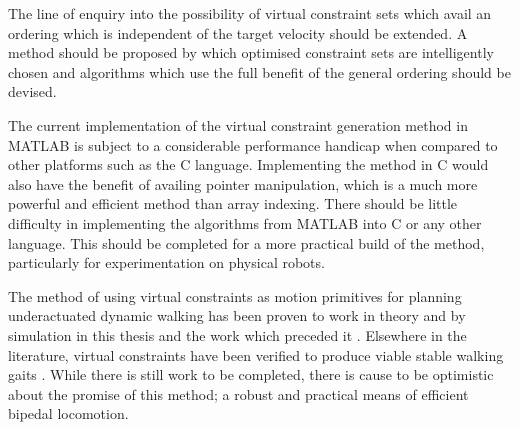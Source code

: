 The line of enquiry into the possibility of virtual constraint sets which avail an ordering which is independent of the target velocity should be extended. A method should be proposed by which optimised constraint sets are intelligently chosen and algorithms which use the full benefit of the general ordering should be devised.

The current implementation of the virtual constraint generation method in MATLAB is subject to a considerable performance handicap when compared to other platforms such as the C language. Implementing the method in C would also have the benefit of availing pointer manipulation, which is a much more powerful and efficient method than array indexing. There should be little difficulty in implementing the algorithms from MATLAB into C or any other language. This should be completed for a more practical build of the method, particularly for experimentation on physical robots.

The method of using virtual constraints as motion primitives for planning underactuated dynamic walking has been proven to work in theory and by simulation in this thesis and the work which preceded it \cite{manchester13planning}. Elsewhere in the literature, virtual constraints have been verified to produce viable stable walking gaits \cite{byl2008approximate, sreenath2011compliant}. While there is still work to be completed, there is cause to be optimistic about the promise of this method; a robust and practical means of efficient bipedal locomotion.